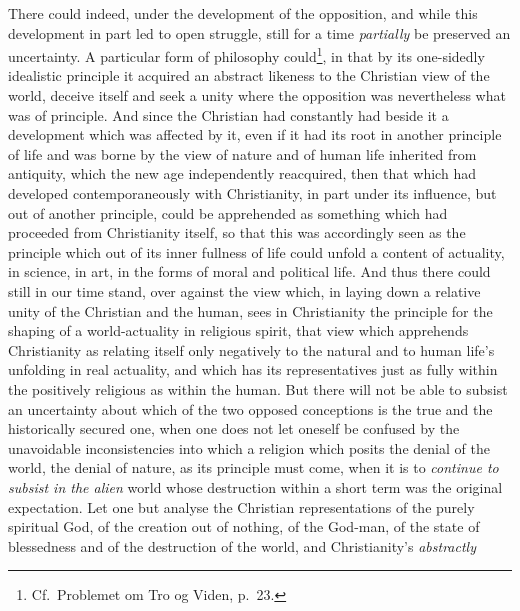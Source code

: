 \documentclass[12pt,a4paper]{book}
\begin{document}
\begin{enumerate}[label=\arabic*., leftmargin=*, labelsep=1em,
                  topsep=0.35\baselineskip, itemsep=0.35\baselineskip]
  There could indeed, under the development of the opposition, and while this
  development in part led to open struggle, still for a time \emph{partially} be
  preserved an uncertainty. A particular form of philosophy could\footnote{Cf.\
  Problemet om Tro og Viden, p.\ 23.}, in that by its one-sidedly idealistic
  principle it acquired an abstract likeness to the Christian view of the world,
  deceive itself and seek a unity where the opposition was nevertheless what was
  of principle. And since the Christian had constantly had beside it a
  development which was affected by it, even if it had its root in another
  principle of life and was borne by the view of nature and of human life
  inherited from antiquity, which the new age independently reacquired, then
  that which had developed contemporaneously with Christianity, in part under
  its influence, but out of another principle, could be apprehended as something
  which had proceeded from Christianity itself, so that this was accordingly
  seen as the principle which out of its inner fullness of life could unfold a
  content of actuality, in science, in art, in the forms of moral and political
  life. And thus there could still in our time stand, over against the view
  which, in laying down a relative unity of the Christian and the human, sees in
  Christianity the principle for the shaping of a world-actuality in religious
  spirit, that view which apprehends Christianity as relating itself only
  negatively to the natural and to human life's unfolding in real actuality, and
  which has its representatives just as fully within the positively religious as
  within the human. But there will not be able to subsist an uncertainty about
  which of the two opposed conceptions is the true and the historically secured
  one, when one does not let oneself be confused by the unavoidable
  inconsistencies into which a religion which posits the denial of the world,
  the denial of nature, as its principle must come, when it is to
  \emph{continue to subsist in the alien} world whose destruction within a short
  term was the original expectation.
  Let one but analyse the Christian representations of the purely spiritual God,
  of the creation out of nothing, of the God-man, of the state of blessedness
  and of the destruction of the world, and Christianity's \emph{abstractly
}
\end{enumerate}
\end{document}
